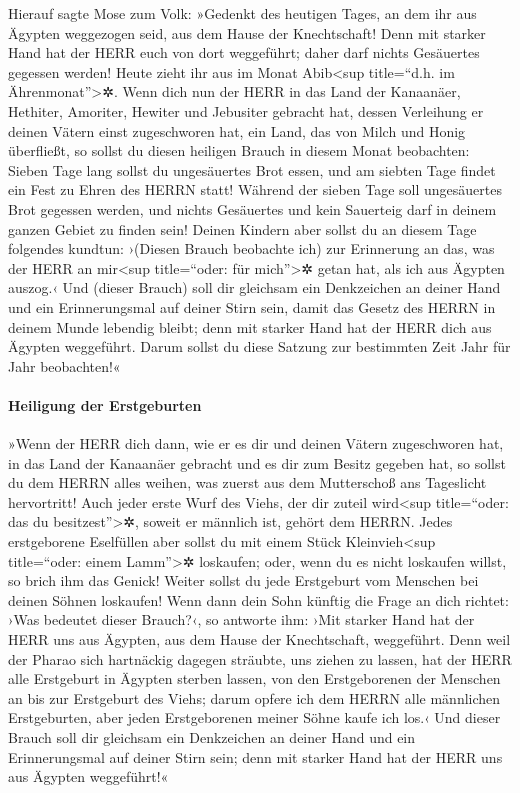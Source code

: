  Hierauf sagte Mose zum Volk: »Gedenkt des heutigen Tages,
an dem ihr aus Ägypten weggezogen seid, aus dem Hause der Knechtschaft!
Denn mit starker Hand hat der HERR euch von dort weggeführt; daher darf
nichts Gesäuertes gegessen werden!  Heute zieht ihr aus im
Monat Abib\textless sup title=``d.h. im Ährenmonat''\textgreater✲.
 Wenn dich nun der HERR in das Land der Kanaanäer,
Hethiter, Amoriter, Hewiter und Jebusiter gebracht hat, dessen
Verleihung er deinen Vätern einst zugeschworen hat, ein Land, das von
Milch und Honig überfließt, so sollst du diesen heiligen Brauch in
diesem Monat beobachten:  Sieben Tage lang sollst du
ungesäuertes Brot essen, und am siebten Tage findet ein Fest zu Ehren
des HERRN statt!  Während der sieben Tage soll
ungesäuertes Brot gegessen werden, und nichts Gesäuertes und kein
Sauerteig darf in deinem ganzen Gebiet zu finden sein! 
Deinen Kindern aber sollst du an diesem Tage folgendes kundtun: ›(Diesen
Brauch beobachte ich) zur Erinnerung an das, was der HERR an
mir\textless sup title=``oder: für mich''\textgreater✲ getan hat, als
ich aus Ägypten auszog.‹  Und (dieser Brauch) soll dir
gleichsam ein Denkzeichen an deiner Hand und ein Erinnerungsmal auf
deiner Stirn sein, damit das Gesetz des HERRN in deinem Munde lebendig
bleibt; denn mit starker Hand hat der HERR dich aus Ägypten weggeführt.
 Darum sollst du diese Satzung zur bestimmten Zeit Jahr
für Jahr beobachten!«

\hypertarget{heiligung-der-erstgeburten}{%
\paragraph{Heiligung der
Erstgeburten}\label{heiligung-der-erstgeburten}}

 »Wenn der HERR dich dann, wie er es dir und deinen
Vätern zugeschworen hat, in das Land der Kanaanäer gebracht und es dir
zum Besitz gegeben hat,  so sollst du dem HERRN alles
weihen, was zuerst aus dem Mutterschoß ans Tageslicht hervortritt! Auch
jeder erste Wurf des Viehs, der dir zuteil wird\textless sup
title=``oder: das du besitzest''\textgreater✲, soweit er männlich ist,
gehört dem HERRN.  Jedes erstgeborene Eselfüllen aber
sollst du mit einem Stück Kleinvieh\textless sup title=``oder: einem
Lamm''\textgreater✲ loskaufen; oder, wenn du es nicht loskaufen willst,
so brich ihm das Genick! Weiter sollst du jede Erstgeburt vom Menschen
bei deinen Söhnen loskaufen!  Wenn dann dein Sohn künftig
die Frage an dich richtet: ›Was bedeutet dieser Brauch?‹, so antworte
ihm: ›Mit starker Hand hat der HERR uns aus Ägypten, aus dem Hause der
Knechtschaft, weggeführt.  Denn weil der Pharao sich
hartnäckig dagegen sträubte, uns ziehen zu lassen, hat der HERR alle
Erstgeburt in Ägypten sterben lassen, von den Erstgeborenen der Menschen
an bis zur Erstgeburt des Viehs; darum opfere ich dem HERRN alle
männlichen Erstgeburten, aber jeden Erstgeborenen meiner Söhne kaufe ich
los.‹  Und dieser Brauch soll dir gleichsam ein
Denkzeichen an deiner Hand und ein Erinnerungsmal auf deiner Stirn sein;
denn mit starker Hand hat der HERR uns aus Ägypten weggeführt!«

